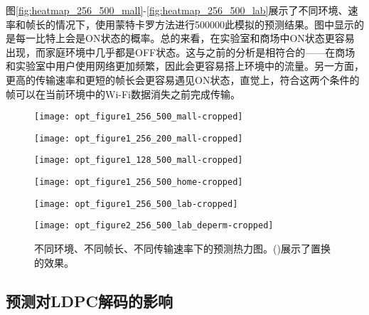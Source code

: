 图\ref{fig:heatmap_256_500_mall}-\ref{fig:heatmap_256_500_lab}展示了不同环境、速率和帧长的情况下，使用蒙特卡罗方法进行500000此模拟的预测结果。图中显示的是每一比特上会是ON状态的概率。总的来看，在实验室和商场中ON状态更容易出现，而家庭环境中几乎都是OFF状态。这与之前的分析是相符合的——在商场和实验室中用户使用网络更加频繁，因此会更容易搭上环境中的流量。另一方面，更高的传输速率和更短的帧长会更容易遇见ON状态，直觉上，符合这两个条件的帧可以在当前环境中的Wi-Fi数据消失之前完成传输。
\begin{figure}[t]
	\begin{minipage}[b]{.32\linewidth}
		\texttt{[image: opt\_figure1\_256\_500\_mall-cropped]}
		\label{fig:heatmap_256_500_mall}
	\end{minipage}
	\hfill
	\begin{minipage}[b]{.32\linewidth}
		\texttt{[image: opt\_figure1\_256\_200\_mall-cropped]}
		\label{fig:heatmap_256_200_mall}
	\end{minipage}
	\hfill
	\begin{minipage}[b]{.32\linewidth}
		\texttt{[image: opt\_figure1\_128\_500\_mall-cropped]}
		\label{fig:heatmap_128_500_mall}
	\end{minipage}
	
	\begin{minipage}[b]{.32\linewidth}
		\texttt{[image: opt\_figure1\_256\_500\_home-cropped]}
		\label{fig:heatmap_256_500_home}
	\end{minipage}
	\hfill
	\begin{minipage}[b]{.32\linewidth}
		\texttt{[image: opt\_figure1\_256\_500\_lab-cropped]}
		\label{fig:heatmap_256_500_lab}
	\end{minipage}
	\hfill
	\begin{minipage}[b]{.32\linewidth}
		\texttt{[image: opt\_figure2\_256\_500\_lab\_deperm-cropped]}
		\label{fig:heatmap_perm}
	\end{minipage}
	\caption{不同环境、不同帧长、不同传输速率下的预测热力图。()展示了置换的效果。}\label{fig:heatmap}
\end{figure}

\subsection{预测对LDPC解码的影响}

